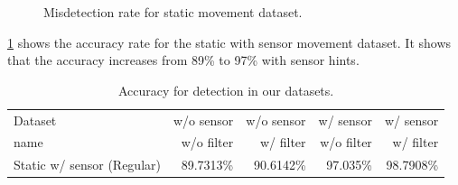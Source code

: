 \begin{figure}[!ht]
\centering
{}

\caption{Misdetection rate for static movement dataset.}
\label{f:fp_stat}
\end{figure}

\ref{t:acc_stat} shows the accuracy rate for the static with sensor movement dataset.
It shows that the accuracy increases from 89\% to 97\% with sensor hints.

\begin{table}[h!]
  \centering
  \caption{Accuracy for detection in our datasets.}
  \label{t:acc_stat}
  \begin{tabular}{  l  r  r r r }
    \rowcolor{gray!50}
    Dataset & w/o sensor & w/o sensor & w/ sensor & w/ sensor \\
    \rowcolor{gray!50}
    name & w/o filter & w/ filter & w/o filter & w/ filter \\
    \hline
    Static w/ sensor (Regular) & 89.7313\% & 90.6142\% & 97.035\% & 98.7908\% \\
    \hline
  \end{tabular}
\end{table}


